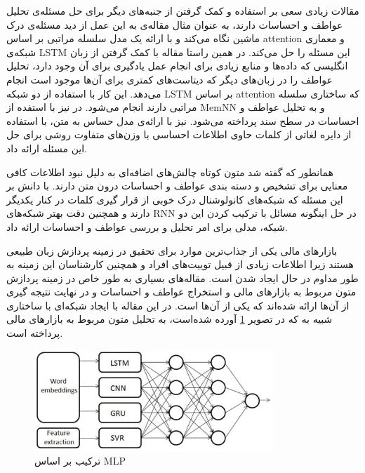 \documentclass[12pt, a4paper, oneside]{report}
\begin{document}
مقالات زیادی سعی بر استفاده و کمک گرفتن از جنبه‌های دیگر برای حل مسئله‌ی تحلیل عواطف و احساسات دارند،
به عنوان مثال مقاله‌ی
\cite{yin-etal-2017-document}
به این عمل از دید مسئله‌ی درک ماشین نگاه می‌کند و با ارائه یک مدل سلسله مراتبی بر اساس
attention
و معماری شبکه‌ی
LSTM
این مسئله را حل می‌کند.
در همین راستا مقاله
\cite{zhou-etal-2016-attention}
با کمک گرفتن از زبان انگلیسی که داده‌ها و منابع زیادی برای انجام عمل یادگیری برای آن وجود دارد، تحلیل
عواطف را در زبان‌های دیگر که دیتاست‌های کمتری برای آن‌ها موجود است انجام می‌دهد. این کار با استفاده از دو شبکه
LSTM
بر اساس
attention
که ساختاری سلسله مراتبی دارند انجام می‌شود.
در
\cite{ijcai2017-311}
نیز با استفده از
MemNN
و
به تحلیل عواطف و احساسات در سطح سند پرداخته می‌شود.
\cite{teng-etal-2016-context}
نیز با ارائه‌ی مدل
حساس به متن، با استفاده از دایره لغاتی از کلمات حاوی اطلاعات احساسی با وزن‌های متفاوت روشی برای حل این مسئله ارائه داد.

همانطور که گفته شد متون کوتاه چالش‌های اضافه‌ای به دلیل نبود اطلاعات کافی معنایی برای تشخیص و دسته بندی عواطف
و احساسات درون متن دارند.
\cite{wang-etal-2016-combination}
با دانش بر این مسئله که شبکه‌های کانولوشنال درک خوبی از قرار گیری کلمات در کنار یکدیگر دارند و همچنین دقت
بهتر شبکه‌های
RNN
در حل اینگونه مسائل با ترکیب کردن این دو شبکه، مدلی برای امر تحلیل و بررسی عواطف و احساسات ارائه داد.

بازارهای مالی یکی از جذاب‌ترین موارد برای تحقیق در زمینه پردازش زبان طبیعی هستند زیرا اطلاعات زیادی از قبیل
توییت‌های افراد و همچنین کارشناسان این زمینه به طور مداوم در حال ایجاد شدن است. مقاله‌های بسیاری به طور خاص در زمینه
پردازش متون مربوط به بازارهای مالی و استخراج عواطف و احساسات و در نهایت نتیجه گیری از آن‌ها ارائه شده‌اند که
\cite{akhtar2017multilayer}
یکی از آن‌ها است. در این مقاله با ایجاد شبکه‌ای با ساختاری شبیه به
که در تصویر
\ref{fig:MLP-ensemble}
آورده شده‌است، به تحلیل متون مربوط به بازار‌های مالی پرداخته است.

\begin{figure}[h]
    \centering
    \includegraphics[width=0.8\textwidth]{MLPENSEMBLE}
    \caption{ ترکیب بر اساس MLP }
    \label{fig:MLP-ensemble}
\end{figure}
\end{document}
